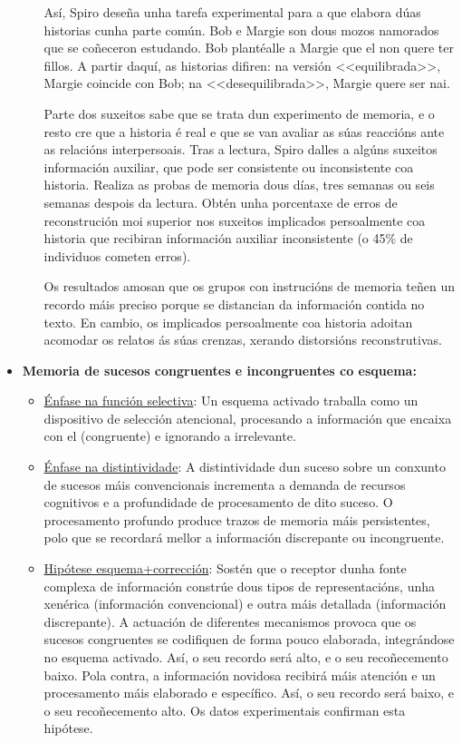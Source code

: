 \documentclass[a4paper,11pt]{article}
\begin{document}
\begin{itemize}
\begin{itemize}
		Así, Spiro deseña unha tarefa experimental para a que elabora dúas historias cunha parte 
		común. Bob e Margie son dous mozos namorados que se coñeceron estudando. Bob plantéalle a 
		Margie que el non quere ter fillos. A partir daquí, as historias difiren: na versión 
		<<equilibrada>>, Margie coincide con Bob; na <<desequilibrada>>, Margie quere ser nai. 
		
		Parte dos suxeitos sabe que se trata dun experimento de memoria, e o resto cre que a 
		historia é real e que se van avaliar as súas reaccións ante as relacións interpersoais. Tras 
		a lectura, Spiro dalles a algúns suxeitos información auxiliar, que pode ser consistente ou 
		inconsistente coa historia. Realiza as probas de memoria dous días, tres semanas ou seis 
		semanas despois da lectura. Obtén unha porcentaxe de erros de reconstrución moi superior nos 
		suxeitos implicados persoalmente coa historia que recibiran información auxiliar 
		inconsistente (o 45\% de individuos cometen erros). 
		
		Os resultados amosan que os grupos con instrucións de memoria teñen un recordo máis preciso 
		porque se distancian da información contida no texto. En cambio, os implicados persoalmente 
		coa historia adoitan acomodar os relatos ás súas crenzas, xerando distorsións 
		reconstrutivas.
	\end{itemize}
	\item \textbf{Memoria de sucesos congruentes e incongruentes co esquema:} 
	\begin{itemize}
		\item \underline{Énfase na función selectiva}: Un esquema activado traballa como un 
		dispositivo de selección atencional, procesando a información que encaixa con el 
		(congruente) e ignorando a irrelevante.
		\item \underline{Énfase na distintividade}: A distintividade dun suceso sobre un conxunto de 
		sucesos máis convencionais incrementa a demanda de recursos cognitivos e a profundidade de 
		procesamento de dito suceso. O procesamento profundo produce trazos de memoria máis 
		persistentes, polo que se recordará mellor a información discrepante ou incongruente.
		\item \underline{Hipótese esquema+corrección}: Sostén que o receptor dunha fonte complexa de 
		información constrúe dous tipos de representacións, unha xenérica (información convencional) 
		e outra máis detallada (información discrepante). A actuación de diferentes mecanismos 
		provoca que os sucesos congruentes se codifiquen de forma pouco elaborada, integrándose no 
		esquema activado. Así, o seu recordo será alto, e o seu recoñecemento baixo. Pola contra, a 
		información novidosa recibirá máis atención e un procesamento máis elaborado e específico. 
		Así, o seu recordo será baixo, e o seu recoñecemento alto. Os datos experimentais confirman 
		esta hipótese.
	\end{itemize}
\end{itemize}
\end{document}
